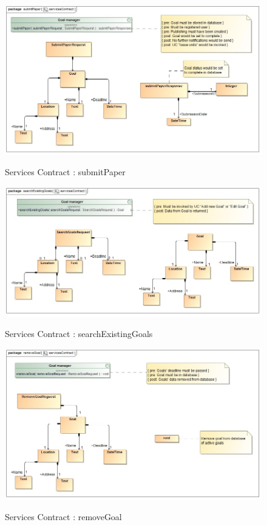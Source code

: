 \documentclass{article}
\begin{document}
		\begin{figure}[H]
			\includegraphics[width=\textwidth]{Ruan_Diagrams/submitPaper_servicesContract.jpg}  \\
			\caption{Services Contract : submitPaper}
		\end{figure}
		\begin{figure}[H]
			\includegraphics[width=\textwidth]{Ruan_Diagrams/searchExistingGoals_servicesContract.jpg}  \\
			\caption{Services Contract : searchExistingGoals}
		\end{figure}
		\begin{figure}[H]
			\includegraphics[width=\textwidth]{Ruan_Diagrams/removeGoal_servicesContract.jpg}  \\
			\caption{Services Contract : removeGoal}
		\end{figure}
\end{document}
